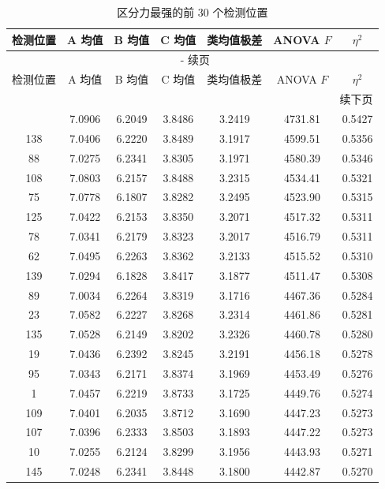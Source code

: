\documentclass[12pt,a4paper]{article}
\renewcommand{\thetable}{\arabic{section}-\arabic{table}}
\begin{document}
\begin{longtable}{ccccccc}
\caption{区分力最强的前 30 个检测位置}\label{tab:anova30}\\
\toprule
检测位置 & A 均值 & B 均值 & C 均值 & 类均值极差 & ANOVA $F$ & $\eta^2$ \\
\midrule
\endfirsthead
\multicolumn{7}{c}{{\tablename\ \thetable{} 续页}}\\
\toprule
检测位置 & A 均值 & B 均值 & C 均值 & 类均值极差 & ANOVA $F$ & $\eta^2$ \\
\midrule
\endhead
\midrule
\multicolumn{7}{r}{{续下页}}\\
\endfoot
\bottomrule
\endlastfoot
134 & 7.0906 & 6.2049 & 3.8486 & 3.2419 & 4731.81 & 0.5427 \\
138 & 7.0406 & 6.2220 & 3.8489 & 3.1917 & 4599.51 & 0.5356 \\
88  & 7.0275 & 6.2341 & 3.8305 & 3.1971 & 4580.39 & 0.5346 \\
108 & 7.0803 & 6.2157 & 3.8488 & 3.2315 & 4534.41 & 0.5321 \\
75  & 7.0778 & 6.1807 & 3.8282 & 3.2495 & 4523.90 & 0.5315 \\
125 & 7.0422 & 6.2153 & 3.8350 & 3.2071 & 4517.32 & 0.5311 \\
78  & 7.0341 & 6.2179 & 3.8323 & 3.2017 & 4516.79 & 0.5311 \\
62  & 7.0495 & 6.2263 & 3.8362 & 3.2133 & 4515.52 & 0.5310 \\
139 & 7.0294 & 6.1828 & 3.8417 & 3.1877 & 4511.47 & 0.5308 \\
89  & 7.0034 & 6.2264 & 3.8319 & 3.1716 & 4467.36 & 0.5284 \\
23  & 7.0582 & 6.2227 & 3.8268 & 3.2314 & 4461.86 & 0.5281 \\
135 & 7.0528 & 6.2149 & 3.8202 & 3.2326 & 4460.78 & 0.5280 \\
19  & 7.0436 & 6.2392 & 3.8245 & 3.2191 & 4456.18 & 0.5278 \\
95  & 7.0343 & 6.2171 & 3.8374 & 3.1969 & 4453.49 & 0.5276 \\
1   & 7.0457 & 6.2219 & 3.8733 & 3.1725 & 4449.76 & 0.5274 \\
109 & 7.0401 & 6.2035 & 3.8712 & 3.1690 & 4447.23 & 0.5273 \\
107 & 7.0396 & 6.2333 & 3.8503 & 3.1893 & 4447.22 & 0.5273 \\
10  & 7.0255 & 6.2124 & 3.8299 & 3.1956 & 4443.93 & 0.5271 \\
145 & 7.0248 & 6.2341 & 3.8448 & 3.1800 & 4442.87 & 0.5270 \\

\end{longtable}
\end{document}
